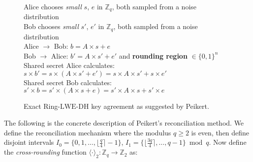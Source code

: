  

\begin{figure}[H]
    \centering
	Alice chooses \textit{small} $s$, $e$ in ${\mathbb{Z}}_{q}$, both sampled from a noise distribution\\
	Bob chooses \textit{small} $s'$, $e'$ in ${\mathbb{Z}}_{q}$, both sampled from a noise distribution\\
	Alice $\to$ Bob: $b = A \times s + e$\\
	Bob $\to$ Alice: $b' = A \times s' + e'$ and \textbf{rounding region} $ \in \{0,1\}^{n}$\\
	Shared secret Alice calculates: $s \times b' = s \times (A \times s' + e') = s \times A \times s' + s \times e'$\\
	Shared secret Bob calculates: $s' \times b = s' \times (A \times s + e) = s' \times A \times s + s' \times e$
	\caption{Exact Ring-$\mathrm{LWE\text{-}DH}$ key agreement as suggested by Peikert.}
\end{figure}		
		

The following is the concrete description of Peikert's reconciliation method. We define the reconciliation mechanism where the modulus $q \ge 2$ is even, then define disjoint intervals $I_{0} = \{0, 1, \dots, \lfloor \frac{q}{4} \rceil- 1\}$, $I_{1} =  \{\lfloor \frac{3q}{4}\rceil, \dots, q-1\} \bmod q$. Now define the \textit{cross-rounding} function $\langle \cdot \rangle _{2}: \mathbb{Z}_{q} \to \mathbb{Z}_{2}$ as:


 


